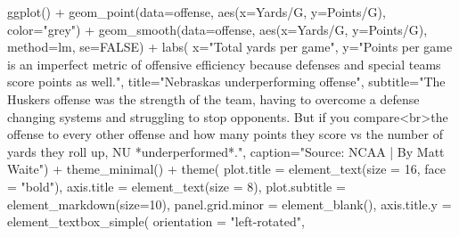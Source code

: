 \documentclass[
  letterpaper,
  DIV=11,
  numbers=noendperiod]{scrreprt}
\newenvironment{Shaded}{\begin{snugshade}}{\end{snugshade}}
\newcommand{\AttributeTok}[1]{\textcolor[rgb]{0.40,0.45,0.13}{#1}}
\newcommand{\ConstantTok}[1]{\textcolor[rgb]{0.56,0.35,0.01}{#1}}
\newcommand{\DecValTok}[1]{\textcolor[rgb]{0.68,0.00,0.00}{#1}}
\newcommand{\FunctionTok}[1]{\textcolor[rgb]{0.28,0.35,0.67}{#1}}
\newcommand{\NormalTok}[1]{\textcolor[rgb]{0.00,0.23,0.31}{#1}}
\newcommand{\SpecialCharTok}[1]{\textcolor[rgb]{0.37,0.37,0.37}{#1}}
\newcommand{\StringTok}[1]{\textcolor[rgb]{0.13,0.47,0.30}{#1}}
\begin{document}
\begin{Shaded}
\begin{Highlighting}[]
\FunctionTok{ggplot}\NormalTok{() }\SpecialCharTok{+} 
  \FunctionTok{geom\_point}\NormalTok{(}\AttributeTok{data=}\NormalTok{offense, }\FunctionTok{aes}\NormalTok{(}\AttributeTok{x=}\StringTok{\textasciigrave{}}\AttributeTok{Yards/G}\StringTok{\textasciigrave{}}\NormalTok{, }\AttributeTok{y=}\StringTok{\textasciigrave{}}\AttributeTok{Points/G}\StringTok{\textasciigrave{}}\NormalTok{), }\AttributeTok{color=}\StringTok{"grey"}\NormalTok{) }\SpecialCharTok{+} 
  \FunctionTok{geom\_smooth}\NormalTok{(}\AttributeTok{data=}\NormalTok{offense, }\FunctionTok{aes}\NormalTok{(}\AttributeTok{x=}\StringTok{\textasciigrave{}}\AttributeTok{Yards/G}\StringTok{\textasciigrave{}}\NormalTok{, }\AttributeTok{y=}\StringTok{\textasciigrave{}}\AttributeTok{Points/G}\StringTok{\textasciigrave{}}\NormalTok{), }\AttributeTok{method=}\NormalTok{lm, }\AttributeTok{se=}\ConstantTok{FALSE}\NormalTok{) }\SpecialCharTok{+} 
  \FunctionTok{labs}\NormalTok{(}
    \AttributeTok{x=}\StringTok{"Total yards per game"}\NormalTok{, }
    \AttributeTok{y=}\StringTok{"Points per game is an imperfect metric of offensive efficiency because defenses and special teams score points as well."}\NormalTok{, }
    \AttributeTok{title=}\StringTok{"Nebraska\textquotesingle{}s underperforming offense"}\NormalTok{, }
    \AttributeTok{subtitle=}\StringTok{"The Husker\textquotesingle{}s offense was the strength of the team, having to overcome a defense changing systems and struggling to stop opponents. But if you compare\textless{}br\textgreater{}the offense to every other offense and how many points they score vs the number of yards they roll up, NU *underperformed*."}\NormalTok{, }
    \AttributeTok{caption=}\StringTok{"Source: NCAA | By Matt Waite"}\NormalTok{) }\SpecialCharTok{+} 
  \FunctionTok{theme\_minimal}\NormalTok{() }\SpecialCharTok{+} 
  \FunctionTok{theme}\NormalTok{(}
    \AttributeTok{plot.title =} \FunctionTok{element\_text}\NormalTok{(}\AttributeTok{size =} \DecValTok{16}\NormalTok{, }\AttributeTok{face =} \StringTok{"bold"}\NormalTok{),}
    \AttributeTok{axis.title =} \FunctionTok{element\_text}\NormalTok{(}\AttributeTok{size =} \DecValTok{8}\NormalTok{), }
    \AttributeTok{plot.subtitle =} \FunctionTok{element\_markdown}\NormalTok{(}\AttributeTok{size=}\DecValTok{10}\NormalTok{), }
    \AttributeTok{panel.grid.minor =} \FunctionTok{element\_blank}\NormalTok{(),}
    \AttributeTok{axis.title.y =} \FunctionTok{element\_textbox\_simple}\NormalTok{(}
      \AttributeTok{orientation =} \StringTok{"left{-}rotated"}\NormalTok{,}

\end{Highlighting}
\end{Shaded}
\end{document}
